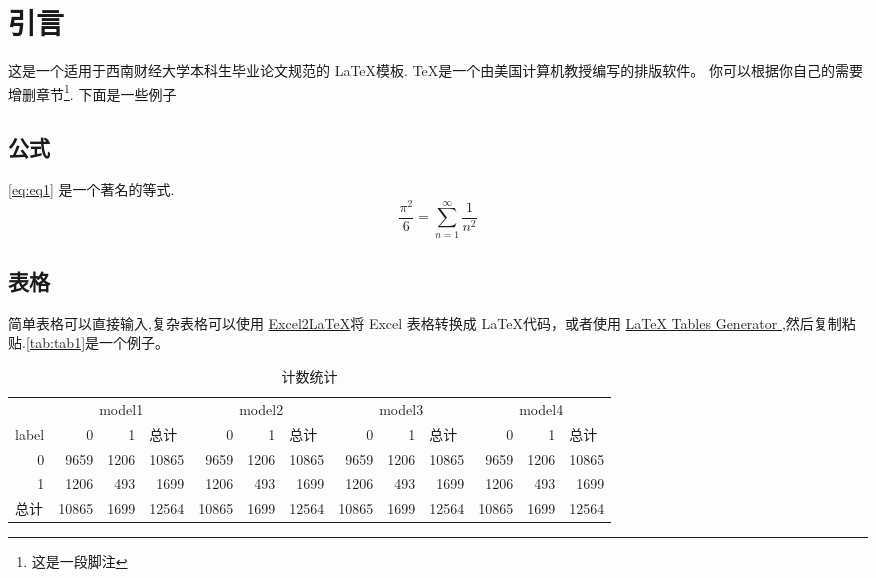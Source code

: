 \section{引言}
这是一个适用于西南财经大学本科生毕业论文规范的 \LaTeX \cite{lamport1994latex,goossens1994latex}模板.
\TeX 是一个由美国计算机教授\citet{knuth1984texbook}编写的排版软件。
你可以根据你自己的需要增删章节\footnote{这是一段脚注}. 下面是一些例子

\subsection{公式}
\autoref{eq:eq1} 是一个著名的等式.
\begin{equation}\label{eq:eq1}
    \frac{\pi^2}{6}=\sum_{n=1}^{\infty}\frac{1}{n^2}
\end{equation}
\subsection{表格}
简单表格可以直接输入,复杂表格可以使用 \href{https://github.com/krlmlr/Excel2LaTeX}{Excel2LaTeX}将 Excel 表格转换成 \LaTeX 代码，或者使用 \href{https://www.tablesgenerator.com/latex_tables}{LaTeX Tables Generator
},然后复制粘贴.\autoref{tab:tab1}是一个例子。 
\begin{table}[htbp]
    \centering
    \caption{计数统计}
      \begin{tabular}{|l|rrr|rrr|rrr|rrr|}
      \hline
        & \multicolumn{3}{c|}{model1} & \multicolumn{3}{c|}{model2} & \multicolumn{3}{c|}{model3} & \multicolumn{3}{c|}{model4} \bigstrut\\
  \cline{2-13}    label & 0 & 1 & \multicolumn{1}{l|}{总计} & 0 & 1 & \multicolumn{1}{l|}{总计} & 0 & 1 & \multicolumn{1}{l|}{总计} & 0 & 1 & \multicolumn{1}{l|}{总计} \bigstrut\\
      \hline
      \multicolumn{1}{|r|}{0} & 9659 & 1206 & 10865 & 9659 & 1206 & 10865 & 9659 & 1206 & 10865 & 9659 & 1206 & 10865 \bigstrut[t]\\
      \multicolumn{1}{|r|}{1} & 1206 & 493 & 1699 & 1206 & 493 & 1699 & 1206 & 493 & 1699 & 1206 & 493 & 1699 \\
      总计 & 10865 & 1699 & 12564 & 10865 & 1699 & 12564 & 10865 & 1699 & 12564 & 10865 & 1699 & 12564 \bigstrut[b]\\
      \hline
      \end{tabular}%
    \label{tab:tab1}%
  \end{table}%
  
